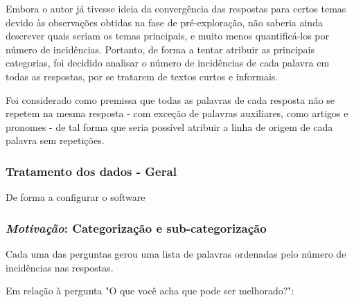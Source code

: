 Embora o autor já tivesse ideia da convergência das respostas para certos temas devido às observações obtidas na fase de pré-exploração, não saberia ainda descrever quais seriam os temas principais, e muito menos quantificá-los por número de incidências. Portanto, de forma a tentar atribuir as principais categorias, foi decidido analisar o número de incidências de cada palavra em todas as respostas, por se tratarem de textos curtos e informais.

Foi considerado como premissa que todas as palavras de cada resposta não se repetem na mesma resposta - com exceção de palavras auxiliares, como artigos e pronomes - de tal forma que seria possível atribuir a linha de origem de cada palavra sem repetições.

\subsubsection*{Tratamento dos dados - Geral}

De forma a configurar o software 

\subsubsection*{\textit{Motivação}: Categorização e sub-categorização}

Cada uma das perguntas gerou uma lista de palavras ordenadas pelo número de incidências nas respostas.


Em relação à pergunta "O que você acha que pode ser melhorado?":

